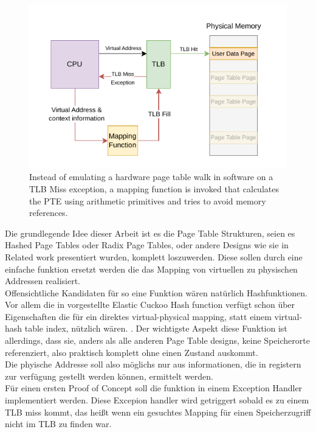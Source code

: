 \begin{figure}[ht!]
    \centering
    \includegraphics[scale=1.5]{figures/theory_mapping_fx.pdf}
    \caption[Virtual Memory using a mapping function]{Instead of emulating a hardware page table walk in software on
        a TLB Miss exception, a mapping function is invoked that calculates the PTE using arithmetic primitives and tries
        to avoid memory references.}
    \label{fig:theory:mapping_fx}
\end{figure}





Die grundlegende Idee dieser Arbeit ist es die Page Table Strukturen, seien es Hashed Page Tables oder
Radix Page Tables, oder andere Designs wie sie in Related work presentiert wurden, komplett loszuwerden.
Diese sollen durch eine einfache funktion ersetzt werden die das Mapping von virtuellen zu physischen
Addressen realisiert.\\
Offensichtliche Kandidaten für so eine Funktion wären natürlich Hashfunktionen. Vor allem die in
\cite{skarlatos2020elastic} vorgestellte Elastic Cuckoo Hash function verfügt schon über Eigenschaften
die für ein direktes virtual-physical mapping, statt einem virtual-hash table index, nützlich wären.
.
Der wichtigste Aspekt diese Funktion ist allerdings, dass sie, anders als alle anderen Page Table designs,
keine Speicherorte referenziert, also praktisch komplett ohne einen Zustand auskommt.\\
Die phyische Addresse soll also möglichs nur aus informationen,  die in registern zur verfügung
gestellt werden können, ermittelt werden.\\
Für einen ersten Proof of Concept soll die funktion in einem Exception Handler implementiert werden.
Diese Excepion handler wird getriggert sobald es zu einem TLB miss kommt, das heißt wenn ein
gesuchtes Mapping für einen Speicherzugriff nicht im TLB zu finden war.

